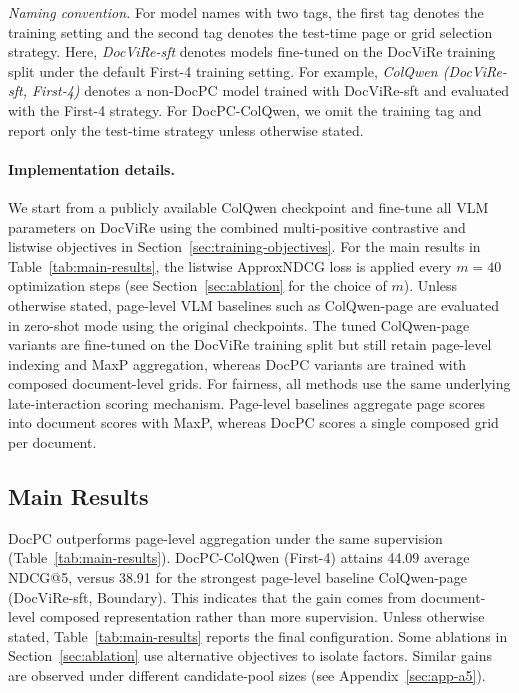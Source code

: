 \emph{Naming convention.} For model names with two tags, the first tag denotes the training setting and the second tag denotes the test-time page or grid selection strategy. Here, \emph{DocViRe-sft} denotes models fine-tuned on the DocViRe training split under the default First-4 training setting. For example, \emph{ColQwen (DocViRe-sft, First-4)} denotes a non-DocPC model trained with DocViRe-sft and evaluated with the First-4 strategy. For DocPC-ColQwen, we omit the training tag and report only the test-time strategy unless otherwise stated.

\paragraph{Implementation details.}
We start from a publicly available ColQwen checkpoint and fine-tune all VLM parameters on DocViRe using the combined multi-positive contrastive and listwise objectives in Section~\ref{sec:training-objectives}. For the main results in Table~\ref{tab:main-results}, the listwise ApproxNDCG loss is applied every $m{=}40$ optimization steps (see Section~\ref{sec:ablation} for the choice of $m$). Unless otherwise stated, page-level VLM baselines such as ColQwen-page are evaluated in zero-shot mode using the original checkpoints. The tuned ColQwen-page variants are fine-tuned on the DocViRe training split but still retain page-level indexing and MaxP aggregation, whereas DocPC variants are trained with composed document-level grids. 
For fairness, all methods use the same underlying late-interaction scoring mechanism. Page-level baselines aggregate page scores into document scores with MaxP, whereas DocPC scores a single composed grid per document.

\subsection{Main Results}

DocPC outperforms page-level aggregation under the same supervision (Table~\ref{tab:main-results}). DocPC-ColQwen (First-4) attains 44.09 average NDCG@5, versus 38.91 for the strongest page-level baseline ColQwen-page (DocViRe-sft, Boundary). This indicates that the gain comes from document-level composed representation rather than more supervision. Unless otherwise stated, Table~\ref{tab:main-results} reports the final configuration. Some ablations in Section~\ref{sec:ablation} use alternative objectives to isolate factors. Similar gains are observed under different candidate-pool sizes (see Appendix~\ref{sec:app-a5}).

